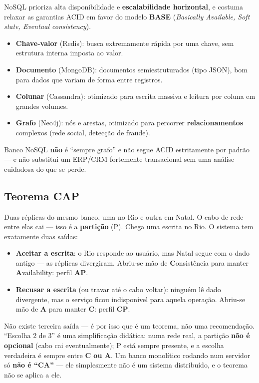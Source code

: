 \begin{conceito}
NoSQL prioriza alta disponibilidade e \textbf{escalabilidade horizontal},
e costuma relaxar as garantias ACID em favor do modelo \textbf{BASE}
(\textit{Basically Available, Soft state, Eventual consistency}).

\begin{itemize}
\item \textbf{Chave-valor} (Redis): busca extremamente rápida por uma
chave, sem estrutura interna imposta ao valor.
\item \textbf{Documento} (MongoDB): documentos semiestruturados (tipo
JSON), bom para dados que variam de forma entre registros.
\item \textbf{Colunar} (Cassandra): otimizado para escrita massiva e
leitura por coluna em grandes volumes.
\item \textbf{Grafo} (Neo4j): nós e arestas, otimizado para percorrer
\textbf{relacionamentos} complexos (rede social, detecção de fraude).
\end{itemize}

Banco NoSQL \textbf{não} é “sempre grafo” e não segue ACID estritamente
por padrão --- e não substitui um ERP/CRM fortemente transacional sem
uma análise cuidadosa do que se perde.
\end{conceito}

\subsection{Teorema CAP}
\label{sec:cap-teoria}

\begin{conceito}
Duas réplicas do mesmo banco, uma no Rio e outra em Natal. O cabo de rede
entre elas cai --- isso é a \textbf{partição} (P). Chega uma escrita no
Rio. O sistema tem exatamente duas saídas:

\begin{itemize}
\item \textbf{Aceitar a escrita}: o Rio responde ao usuário, mas Natal
segue com o dado antigo --- as réplicas divergiram. Abriu-se mão de
\textbf{C}onsistência para manter \textbf{A}vailability: perfil
\textbf{AP}.
\item \textbf{Recusar a escrita} (ou travar até o cabo voltar): ninguém
lê dado divergente, mas o serviço ficou indisponível para aquela
operação. Abriu-se mão de \textbf{A} para manter \textbf{C}: perfil
\textbf{CP}.
\end{itemize}

Não existe terceira saída --- é por isso que é um teorema, não uma
recomendação. “Escolha 2 de 3” é uma simplificação didática: numa rede
real, a partição \textbf{não é opcional} (cabo cai eventualmente); P está
sempre presente, e a escolha verdadeira é sempre entre \textbf{C ou A}. Um
banco monolítico rodando num servidor só \textbf{não é “CA”} --- ele
simplesmente não é um sistema distribuído, e o teorema não se aplica a
ele.
\end{conceito}

